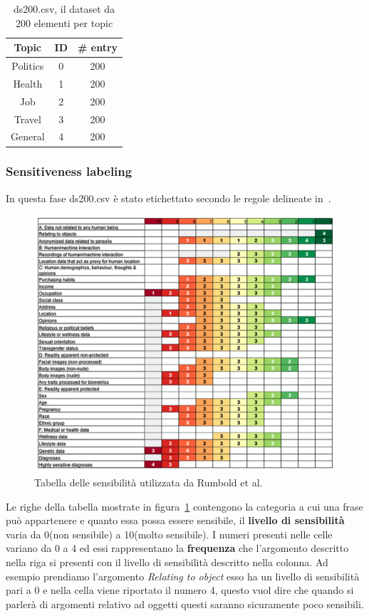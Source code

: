 \begin{table}[h!t]
    \centering
    \begin{tabular}{c|c|c}
    \hline
        \textbf{Topic} & \textbf{ID} & \textbf{\# entry} \\ \hline
        Politics & 0 & 200 \\ \hline
        Health & 1 & 200 \\ \hline
        Job & 2 & 200 \\ \hline
        Travel & 3 & 200 \\ \hline
        General & 4 & 200 \\ \hline
    \end{tabular}
    \caption{ds200.csv, il dataset da 200 elementi per topic}
    \label{tab:ds200.csv}
\end{table}
\FloatBarrier

\subsubsection{Sensitiveness labeling}
\label{sssec:sens_labeling}
In questa fase ds200.csv è stato etichettato secondo le regole delineate in~\cite{dataSpectrum}.
\begin{figure}
    \centering
    \includegraphics[scale=0.4]{Figure/sensTbl.png}
    \caption{Tabella delle sensibilità utilizzata da Rumbold et al.}
    \label{fig:sensRumboldd}
\end{figure}
\FloatBarrier
Le righe della tabella mostrate in figura~\ref{fig:sensRumboldd} contengono la categoria a cui una frase può appartenere e quanto essa possa essere sensibile, il \textbf{livello di sensibilità} varia da 0(non sensibile) a 10(molto sensibile). I numeri presenti nelle celle variano da 0 a 4 ed essi rappresentano la \textbf{frequenza} che l'argomento descritto nella riga si presenti con il livello di sensibilità descritto nella colonna. Ad esempio prendiamo l'argomento \textit{Relating to object} esso ha un livello di sensibilità pari a 0 e nella cella viene riportato il numero 4, questo vuol dire che quando si parlerà di argomenti relativo ad oggetti questi saranno sicuramente poco sensibili.


